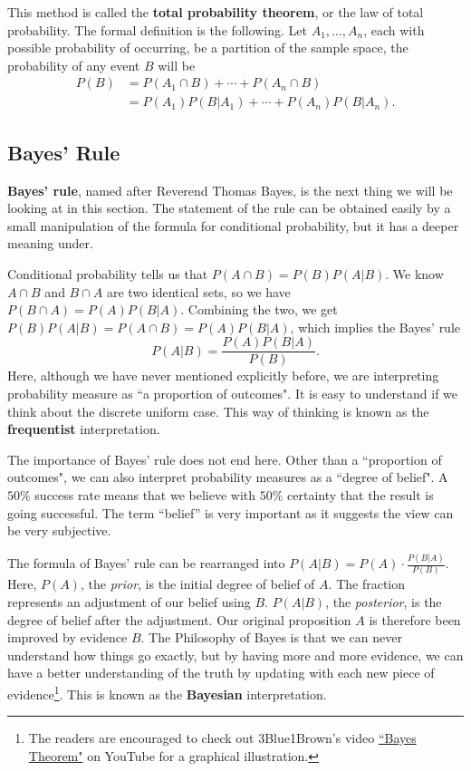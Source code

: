 \documentclass[11pt, a4paper, oneside]{book}
\theoremstyle{definition}
\begin{document}
\noindent This method is called the \textbf{total probability theorem}, or the law of total probability. The formal definition is the following. Let $A_1, \dots, A_n$, each with possible probability of occurring, be a partition of the sample space, the probability of any event $B$ will be 
\begin{equation*}
\begin{split}
P(B) &= P(A_1 \cap B) + \cdots + P(A_n \cap B) \\
&= P(A_1)P(B|A_1) + \cdots + P(A_n)P(B|A_n).
\end{split}
\end{equation*}

\subsection{Bayes' Rule}

\noindent \textbf{Bayes' rule}, named after Reverend Thomas Bayes, is the next thing we will be looking at in this section. The statement of the rule can be obtained easily by a small manipulation of the formula for conditional probability, but it has a deeper meaning under. 

\noindent Conditional probability tells us that $P(A \cap B)=P(B)P(A|B)$. We know $A \cap B$ and $B \cap A$ are two identical sets, so we have $P(B \cap A)=P(A)P(B|A)$. Combining the two, we get $P(B)P(A|B)=P(A \cap B)=P(A)P(B|A)$, which implies the Bayes' rule \[
P(A|B) = \frac{P(A)P(B|A)}{P(B)}.
\]
Here, although we have never mentioned explicitly before, we are interpreting probability measure as ``a proportion of outcomes". It is easy to understand if we think about the discrete uniform case. This way of thinking is known as the \textbf{frequentist} interpretation. 

\noindent The importance of Bayes' rule does not end here. Other than a ``proportion of outcomes", we can also interpret probability measures as a ``degree of belief". A $50\%$ success rate means that we believe with $50\%$ certainty that the result is going successful. The term ``belief'' is very important as it suggests the view can be very subjective. 

\noindent The formula of Bayes' rule can be rearranged into $P(A|B) = P(A) \cdot \frac{P(B|A)}{P(B)}$. Here, $P(A)$, the \emph{prior}, is the initial degree of belief of $A$. The fraction represents an adjustment of our belief using $B$. $P(A|B)$, the \emph{posterior}, is the degree of belief after the adjustment. Our original proposition $A$ is therefore been improved by evidence $B$. The Philosophy of Bayes is that we can never understand how things go exactly, but by having more and more evidence, we can have a better understanding of the truth by updating with each new piece of evidence\footnote{The readers are encouraged to check out 3Blue1Brown's video \href{https://youtu.be/HZGCoVF3YvM}{``Bayes Theorem"} on YouTube for a graphical illustration.}. This is known as the \textbf{Bayesian} interpretation. 
\end{document}
